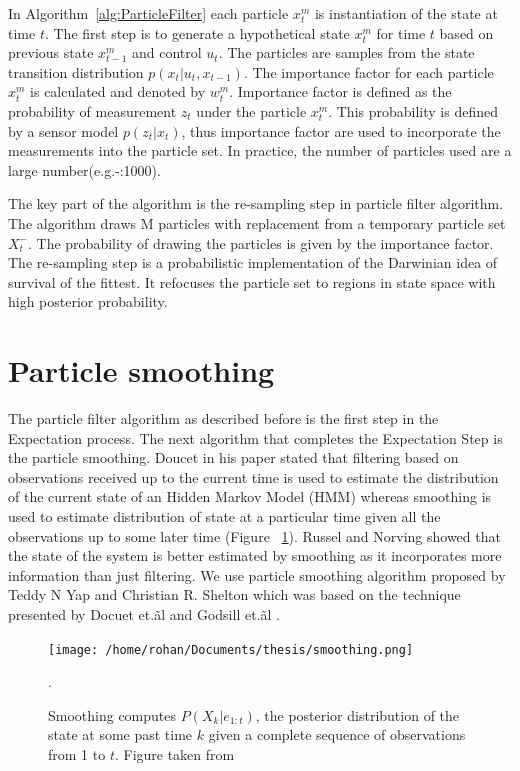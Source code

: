 \documentclass[12pt]{dalcsthesis}
\begin{document}
In Algorithm~\ref{alg:ParticleFilter} each particle $x_{t}^{m}$ is instantiation of the state at time $t$.  The first step is to generate a hypothetical state $x_{t}^{m}$ for time $t$ based on previous state $x_{t-1}^{m}$ and control $u_{t}$. The particles are samples from the state transition distribution $p(x_{t}|u_{t},x_{t-1})$. The importance factor for each particle $x_{t}^{m}$ is calculated and denoted by $w_{t}^{m}$. Importance factor is defined as the probability of measurement $z_{t}$ under the particle $x_{t}^{m}$. This probability is defined by a sensor model $p(z_{t}|x_{t})$, thus importance factor are used to incorporate the measurements into the particle set. In practice, the number of particles used are a large number(e.g.-:1000).

The key part of the algorithm is the re-sampling step in particle filter algorithm. The algorithm draws M particles with replacement from a temporary particle set $X_{t}^{-}$. The probability of drawing the particles is given by the importance factor. The re-sampling step is a probabilistic implementation of the Darwinian idea of survival of the fittest. It refocuses the particle set to regions in state space with high posterior probability. 

\section{Particle smoothing}
\label{ch-: particle smoothing}
The particle filter algorithm as described before is the first step in the Expectation process. The next algorithm that completes the Expectation Step is the particle smoothing. Doucet \cite{doucet2009tutorial} in his paper stated that filtering based on observations received up to the current time is used to estimate the distribution of the current state of an Hidden Markov Model (HMM) whereas smoothing is used to estimate distribution of state at a particular time given all the observations up to some later time (Figure ~\ref{fig: particle smoothing}). Russel and Norving \cite{russell2003artificial} showed that the state of the system is better estimated by smoothing as it incorporates more information than just filtering. We use particle smoothing algorithm proposed by Teddy N Yap and Christian R. Shelton \cite{Yap2008} which was based on the technique presented by Docuet et.\~al \cite{doucet2000monte} and Godsill et.\~al \cite{Godsill2004}.
\begin{figure}
\centering
{\texttt{[image: /home/rohan/Documents/thesis/smoothing.png]}}

\caption{\label{fig: particle smoothing} Smoothing computes $P(X_{k}|e_{1:t})$, the posterior distribution of the state at some past time $k$ given a complete sequence of observations from 1 to $t$. Figure taken from \cite{russell2003artificial}}.
\end{figure}
\end{document}
